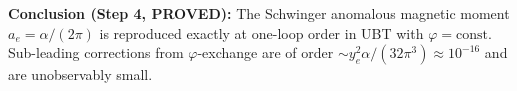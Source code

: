 \documentclass[12pt]{article}
\theoremstyle{definition}
\theoremstyle{remark}
\begin{document}
\begin{resultbox}
\textbf{Conclusion (Step 4, PROVED):}
The Schwinger anomalous magnetic moment $a_e = \alpha/(2\pi)$ is reproduced exactly at
one-loop order in UBT with $\varphi = \mathrm{const}$.  Sub-leading corrections from
$\varphi$-exchange are of order $\sim y_e^2\alpha/(32\pi^3)\approx 10^{-16}$ and are
unobservably small.
\end{resultbox}

\ifdefined\INCLUDEMODE\else
  
\end{document}
